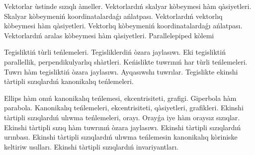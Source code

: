 Vektorlar ùstinde sızıqlı àmeller.
Vektorlardıń skalyar kòbeymesi hàm qàsiyetleri. Skalyar kòbeymeniń koordinatalardaǵı ańlatpası.
Vektorlardıń vektorlıq kòbeymesi hàm qàsiyetleri. Vektorlıq kòbeymeniń koordinatalardaǵı ańlatpası. 
Vektorlardıń aralas kòbeymesi hàm qàsiyetleri. Parallelepiped kòlemi

Tegisliktiń tùrli teńlemeleri. Tegisliklerdiń òzara jaylasıwı.
Eki tegisliktiń parallellik, perpendikulyarlıq shàrtleri.
Keńislikte tuwrınıń har tùrli teńlemeleri. 
Tuwrı hàm tegisliktiń òzara jaylasıwı. Ayqasıwshı tuwrılar.
Tegislikte ekinshi tàrtipli sızıqlardıń kanonikalıq teńlemeleri.

Ellips hàm onıń kanonikalıq teńlemesi, ekcentrisiteti, grafigi.
Giperbola hàm parabola. Kanonikalıq teńlemeleri, ekcentrisiteti, qàsiyetleri, grafikleri.
Ekinshi tàrtipli sızıqlardıń ulıwma teńlemeleri, orayı. Orayǵa iye hàm oraysız sızıqlar.
Ekinshi tàrtipli sızıq hàm tuwrınıń òzara jaylasıwı. Ekinshi tàrtipli sızıqlardıń urınbası.
Ekinshi tàrtipli sızıqlardıń ulıwma teńlemesin kanonikalıq kòriniske keltiriw usılları.
Ekinshi tàrtipli sızıqlardıń invariyantları.